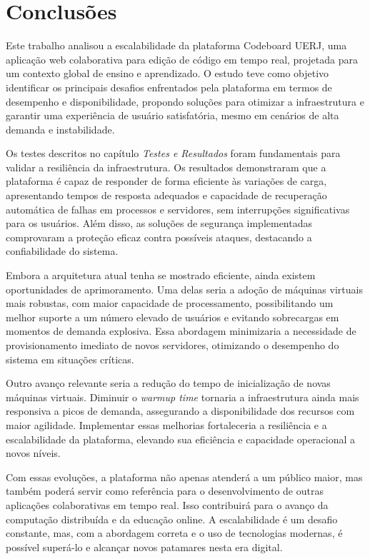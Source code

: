 \chapter*{Conclusões}

Este trabalho analisou a escalabilidade da plataforma Codeboard UERJ, uma aplicação web colaborativa para edição de código em tempo real, projetada para um contexto global de ensino e aprendizado. O estudo teve como objetivo identificar os principais desafios enfrentados pela plataforma em termos de desempenho e disponibilidade, propondo soluções para otimizar a infraestrutura e garantir uma experiência de usuário satisfatória, mesmo em cenários de alta demanda e instabilidade.

Os testes descritos no capítulo \emph{Testes e Resultados} foram fundamentais para validar a resiliência da infraestrutura. Os resultados demonstraram que a plataforma é capaz de responder de forma eficiente às variações de carga, apresentando tempos de resposta adequados e capacidade de recuperação automática de falhas em processos e servidores, sem interrupções significativas para os usuários. Além disso, as soluções de segurança implementadas comprovaram a proteção eficaz contra possíveis ataques, destacando a confiabilidade do sistema.

Embora a arquitetura atual tenha se mostrado eficiente, ainda existem oportunidades de aprimoramento. Uma delas seria a adoção de máquinas virtuais mais robustas, com maior capacidade de processamento, possibilitando um melhor suporte a um número elevado de usuários e evitando sobrecargas em momentos de demanda explosiva. Essa abordagem minimizaria a necessidade de provisionamento imediato de novos servidores, otimizando o desempenho do sistema em situações críticas.

Outro avanço relevante seria a redução do tempo de inicialização de novas máquinas virtuais. Diminuir o \emph{warmup time} tornaria a infraestrutura ainda mais responsiva a picos de demanda, assegurando a disponibilidade dos recursos com maior agilidade. Implementar essas melhorias fortaleceria a resiliência e a escalabilidade da plataforma, elevando sua eficiência e capacidade operacional a novos níveis.

Com essas evoluções, a plataforma não apenas atenderá a um público maior, mas também poderá servir como referência para o desenvolvimento de outras aplicações colaborativas em tempo real. Isso contribuirá para o avanço da computação distribuída e da educação online. A escalabilidade é um desafio constante, mas, com a abordagem correta e o uso de tecnologias modernas, é possível superá-lo e alcançar novos patamares nesta era digital.